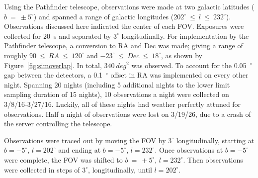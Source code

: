 \documentclass[aps,prb,twocolumn,superscriptaddress]{revtex4-1}
\begin{document}
Using the Pathfinder telescope, observations were made at two galactic latitudes ($b~=~\pm5^{\circ}$) and spanned a range of galactic longitudes ($202^{\circ}~\leq~l~\leq~232^{\circ}$).  Observations discussed here indicated the center of each FOV.  
Exposures were collected for 20~s and separated by $3^{\circ}$ longitudinally.  For implementation by the Pathfinder telescope, a conversion to RA and Dec was made; giving a range of roughly $90~\leq~RA~\leq~120^{\circ}$ and $-23^{\circ}~\leq~Dec~\leq~18^{\circ}$, as shown by Figure~\ref{fig:simoverlap}.  In total, $340~deg^{2}$ was observed.  To account for the 0.05~$^{\circ}$ gap between the detectors, a 0.1~$^{\circ}$ offset in RA was implemented on every other night.  
Spanning 20 nights (including 5 additional nights to the lower limit sampling duration of 15 nights), 10 observations a night were collected on 3/8/16-3/27/16.  Luckily, all of these nights had weather perfectly attuned for observations.  Half a night of observations were lost on 3/19/26, due to a crash of the server controlling the telescope.


Observations were traced out by moving the FOV by $3^{\circ}$ longitudinally, starting at $b=-5^{\circ}$, $l=202^{\circ}$ and ending at $b=-5^{\circ}$, $l=232^{\circ}$.  Once observations at $b=-5^{\circ}$ were complete, the FOV was shifted to $b~=~+5^{\circ}$, $l=232^{\circ}$. Then observations were collected in steps of $3^{\circ}$, longitudinally, until $l=202^{\circ}$. 


\end{document}
